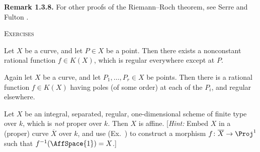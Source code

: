 {\medskip
\noindent\hypertarget{result-IV-1.3.8}{}\textbf{Remark 1.3.8.} For other proofs of the Riemann--Roch theorem, see Serre  and Fulton .

\medskip
\noindent\textsc{Exercises}\par\nobreak\smallskip
{\fontsize{9.2}{10.55}\selectfont\leftskip=21pt\relax
\noindent\hypertarget{ex-IV-1.1}{}Let $X$ be a curve, and let $P\in X$ be a point. Then there exists a nonconstant rational function $f\in K(X)$, which is regular everywhere except at $P$.

\smallskip
\noindent\hypertarget{ex-IV-1.2}{}Again let $X$ be a curve, and let $P_1,\ldots,P_r\in X$ be points. Then there is a rational function $f\in K(X)$ having poles (of some order) at each of the $P_i$, and regular elsewhere.

\smallskip
\noindent\hypertarget{ex-IV-1.3}{}Let $X$ be an integral, separated, regular, one-dimensional scheme of finite type over $k$, which is \emph{not} proper over $k$. Then $X$ is affine. [\emph{Hint:} Embed $X$ in a (proper) curve $\overline X$ over $k$, and use (Ex.~) to construct a morphism $f\colon\overline X\to\Proj^1$ such that $f^{-1}(\AffSpace{1})=X$.]\par}
}

